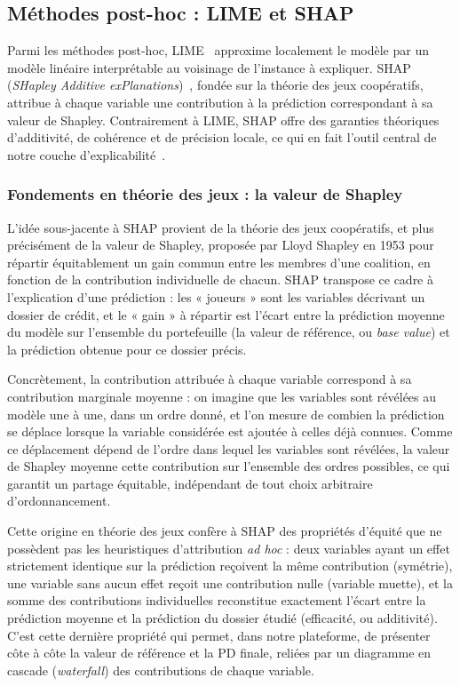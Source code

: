 \documentclass[a4paper,12pt,oneside]{report}
\begin{document}
\subsection{Méthodes post-hoc : LIME et SHAP}

Parmi les méthodes post-hoc, LIME~\cite{ribeiro2016} approxime localement le modèle par un
modèle linéaire interprétable au voisinage de l'instance à expliquer. SHAP
(\textit{SHapley Additive exPlanations})~\cite{lundberg2017}, fondée sur la théorie des jeux
coopératifs, attribue à chaque variable une contribution à la prédiction correspondant à sa
valeur de Shapley. Contrairement à LIME, SHAP offre des garanties théoriques d'additivité, de
cohérence et de précision locale, ce qui en fait l'outil central de notre couche
d'explicabilité~\cite{shapdoc}.

\subsubsection{Fondements en théorie des jeux : la valeur de Shapley}

L'idée sous-jacente à SHAP provient de la théorie des jeux coopératifs, et plus précisément de
la valeur de Shapley, proposée par Lloyd Shapley en 1953 pour répartir équitablement un gain
commun entre les membres d'une coalition, en fonction de la contribution individuelle de
chacun. SHAP transpose ce cadre à l'explication d'une prédiction : les « joueurs » sont les
variables décrivant un dossier de crédit, et le « gain » à répartir est l'écart entre la
prédiction moyenne du modèle sur l'ensemble du portefeuille (la valeur de référence, ou
\textit{base value}) et la prédiction obtenue pour ce dossier précis.

Concrètement, la contribution attribuée à chaque variable correspond à sa contribution
marginale moyenne : on imagine que les variables sont révélées au modèle une à une, dans un
ordre donné, et l'on mesure de combien la prédiction se déplace lorsque la variable considérée
est ajoutée à celles déjà connues. Comme ce déplacement dépend de l'ordre dans lequel les
variables sont révélées, la valeur de Shapley moyenne cette contribution sur l'ensemble des
ordres possibles, ce qui garantit un partage équitable, indépendant de tout choix arbitraire
d'ordonnancement.

Cette origine en théorie des jeux confère à SHAP des propriétés d'équité que ne possèdent pas
les heuristiques d'attribution \textit{ad hoc} : deux variables ayant un effet strictement
identique sur la prédiction reçoivent la même contribution (symétrie), une variable sans aucun
effet reçoit une contribution nulle (variable muette), et la somme des contributions
individuelles reconstitue exactement l'écart entre la prédiction moyenne et la prédiction du
dossier étudié (efficacité, ou additivité). C'est cette dernière propriété qui permet, dans
notre plateforme, de présenter côte à côte la valeur de référence et la PD finale, reliées par
un diagramme en cascade (\textit{waterfall}) des contributions de chaque variable.
\end{document}
